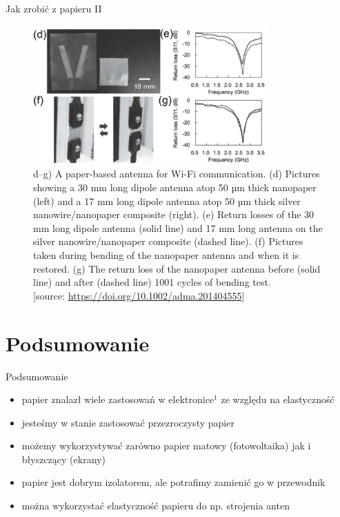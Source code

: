 \documentclass{beamer}
\begin{document}
\begin{frame}{Jak zrobić z papieru II}
        \begin{figure}
        \centering
        \includegraphics[width=0.8\textwidth]{fig10b.jpg}
        \caption{d–g) A paper-based antenna for Wi-Fi communication. (d) Pictures showing a 30 mm long dipole antenna atop 50 µm thick nanopaper (left) and a 17 mm long dipole antenna atop 50 µm thick silver nanowire/nanopaper composite (right). (e) Return losses of the 30 mm long dipole antenna (solid line) and 17 mm long antenna on the silver nanowire/nanopaper composite (dashed line). (f) Pictures taken during bending of the nanopaper antenna and when it is restored. (g) The return loss of the nanopaper antenna before (solid line) and after (dashed line) 1001 cycles of bending test.\\  \typeout{}
        [source: \url{https://doi.org/10.1002/adma.201404555}]}
    \end{figure}
\end{frame}

\section{Podsumowanie}

\begin{frame}{Podsumowanie}
    \begin{itemize}
        \item papier znalazł wiele zastosowań w elektronice$^1$ ze względu na elastyczność
        \item jesteśmy w stanie zastosować przezroczysty papier 
        \item możemy wykorzystywać zarówno papier matowy (fotowoltaika) jak i błyszczący (ekrany)
        \item papier jest dobrym izolatorem, ale potrafimy zamienić go w przewodnik
        \item można wykorzystać elastyczność papieru do np. strojenia anten
    \end{itemize}
\end{frame}
\end{document}
